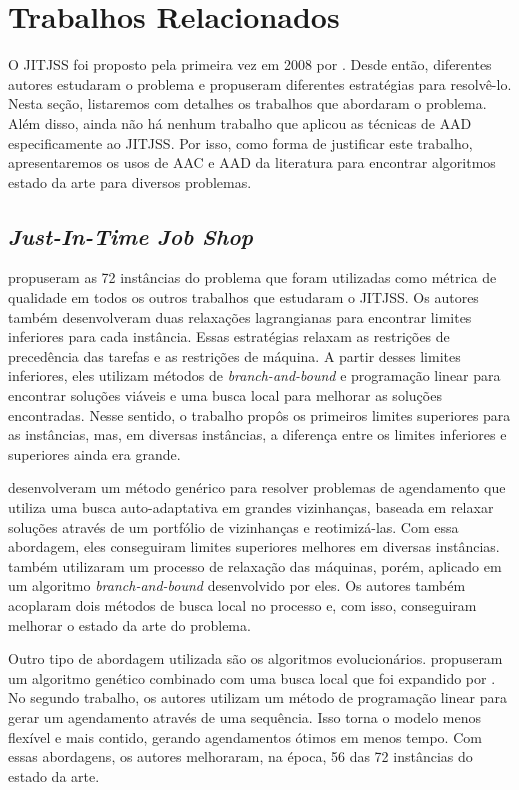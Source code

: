 ﻿\chapter{Trabalhos Relacionados} \label{chapt:trabalhos}

O \ac{JITJSS} foi proposto pela primeira vez em 2008 por \cite{baptiste2008lagrangian}. Desde então, diferentes autores estudaram o problema e propuseram diferentes estratégias para resolvê-lo. Nesta seção, listaremos com detalhes os trabalhos que abordaram o problema. Além disso, ainda não há nenhum trabalho que aplicou as técnicas de \ac{AAD} especificamente ao \ac{JITJSS}. Por isso, como forma de justificar este trabalho, apresentaremos os usos de \ac{AAC} e \ac{AAD} da literatura para encontrar algoritmos estado da arte para diversos problemas. 
 
\section{\textit{Just-In-Time Job Shop}} \label{sect:bibjitjsp}

\cite{baptiste2008lagrangian} propuseram as 72 instâncias do problema que foram utilizadas como métrica de qualidade em todos os outros trabalhos que estudaram o \ac{JITJSS}. Os autores também desenvolveram duas relaxações lagrangianas para encontrar limites inferiores para cada instância. Essas estratégias relaxam as restrições de precedência das tarefas e as restrições de máquina. A partir desses limites inferiores, eles utilizam métodos de \textit{branch-and-bound} e programação linear para encontrar soluções viáveis e uma busca local para melhorar as soluções encontradas. Nesse sentido, o trabalho propôs os primeiros limites superiores para as instâncias, mas, em diversas instâncias, a diferença entre os limites inferiores e superiores ainda era grande.

\cite{laborie2007self} desenvolveram um método genérico para resolver problemas de agendamento que utiliza uma busca auto-adaptativa em grandes vizinhanças, baseada em relaxar soluções através de um portfólio de vizinhanças e reotimizá-las. Com essa abordagem, eles conseguiram limites superiores melhores em diversas instâncias. \cite{monette2009just} também utilizaram um processo de relaxação das máquinas, porém, aplicado em um algoritmo \textit{branch-and-bound} desenvolvido por eles. Os autores também acoplaram dois métodos de busca local no processo e, com isso, conseguiram melhorar o estado da arte do problema.

Outro tipo de abordagem utilizada são os algoritmos evolucionários. \cite{araujo2009genetic} propuseram um algoritmo genético combinado com uma busca local que foi expandido por \cite{dos2010combination}. No segundo trabalho, os autores utilizam um método de programação linear para gerar um agendamento através de uma sequência. Isso torna o modelo menos flexível e mais contido, gerando agendamentos ótimos em menos tempo. Com essas abordagens, os autores melhoraram, na época, 56 das 72 instâncias do estado da arte.

